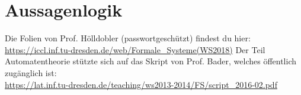 
\chapter{Aussagenlogik}



\vspace{5cm}
Die Folien von Prof. Hölldobler (passwortgeschützt) findest du hier:
\url{https://iccl.inf.tu-dresden.de/web/Formale_Systeme(WS2018)}\nl
Der Teil Automatentheorie stützte sich auf das Skript von Prof. Bader, welches öffentlich zugänglich ist:\\
\url{https://lat.inf.tu-dresden.de/teaching/ws2013-2014/FS/script_2016-02.pdf}
